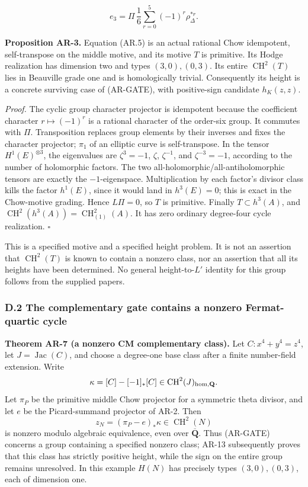 \documentclass[11pt,a4paper]{article}
\begin{document}
\[
e_3=\Pi\,\frac16\sum_{r=0}^5(-1)^r\rho_\Delta^{*r}.
\tag{AR.5}
\]

\textbf{Proposition AR-3.} Equation (AR.5) is an actual rational Chow
idempotent, self-transpose on the middle motive, and its motive \(T\) is
primitive. Its Hodge realization has dimension two and types
\((3,0),(0,3)\). Its entire \(\operatorname{CH}^2(T)\) lies in Beauville
grade one and is homologically trivial. Consequently its height is a
concrete surviving case of (AR-GATE), with positive-sign candidate
\(h_K(z,z)\).

\emph{Proof.} The cyclic group character projector is idempotent because
the coefficient character \(r\mapsto(-1)^r\) is a rational character of
the order-six group. It commutes with \(\Pi\). Transposition replaces
group elements by their inverses and fixes the character projector;
\(\pi_1\) of an elliptic curve is self-transpose. In the tensor
\(H^1(E)^{\otimes3}\), the eigenvalues are \(\zeta^3=-1\), \(\zeta\),
\(\zeta^{-1}\), and \(\zeta^{-3}=-1\), according to the number of
holomorphic factors. The two all-holomorphic/all-antiholomorphic tensors
are exactly the \(-1\)-eigenspace. Multiplication by each factor's
divisor class kills the factor \(h^1(E)\), since it would land in
\(h^3(E)=0\); this is exact in the Chow-motive grading. Hence
\(L\Pi=0\), so \(T\) is primitive. Finally \(T\subset h^3(A)\), and
\(\operatorname{CH}^2(h^3(A))=\operatorname{CH}^2_{(1)}(A)\). It has
zero ordinary degree-four cycle realization. \(\square\)

This is a specified motive and a specified height problem. It is not an
assertion that \(\operatorname{CH}^2(T)\) is known to contain a nonzero
class, nor an assertion that all its heights have been determined. No
general height-to-\(L'\) identity for this group follows from the
supplied papers.

\subsubsection{D.2 The complementary gate contains a nonzero
Fermat-quartic
cycle}\label{d.2-the-complementary-gate-contains-a-nonzero-fermat-quartic-cycle}

\textbf{Theorem AR-7 (a nonzero CM complementary class).} Let
\(C:x^4+y^4=z^4\), let \(J=\operatorname{Jac}(C)\), and choose a
degree-one base class after a finite number-field extension. Write \[
\kappa=[C]-[-1]_*[C]\in\operatorname{CH}^2(J)_{\rm hom,\mathbf Q}.
\] Let \(\pi_P\) be the primitive middle Chow projector for a symmetric
theta divisor, and let \(e\) be the Picard-summand projector of AR-2.
Then \[
z_N=(\pi_P-e)_*\kappa\in\operatorname{CH}^2(N)
\tag{AR.9}
\] is nonzero modulo algebraic equivalence, even over
\(\overline{\mathbf Q}\). Thus (AR-GATE) concerns a group containing a
specified nonzero class; AR-13 subsequently proves that this class has
strictly positive height, while the sign on the entire group remains
unresolved. In this example \(H(N)\) has precisely types
\((3,0),(0,3)\), each of dimension one.
\end{document}
